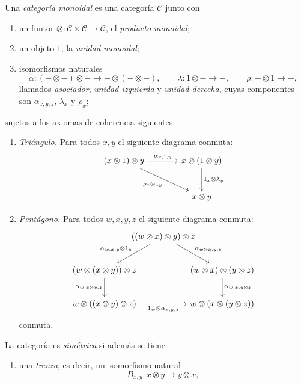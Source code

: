 \begin{defi}\label{defi:monoidal}
Una \emph{categoría monoidal} es una categoría $\mathcal C$ junto con
\begin{enumerate}[label = \textup{(\roman*)}]
\item un funtor $\otimes\colon \mathcal C\times\mathcal C\to\mathcal C$, el \emph{producto monoidal};
\item un objeto $1$, la \emph{unidad monoidal};
\item isomorfismos naturales
\[
\alpha\colon(-\otimes-)\otimes-\longrightarrow-\otimes(-\otimes-),
\qquad
\lambda\colon1\otimes-\longrightarrow-,
\qquad
\rho\colon-\otimes1\longrightarrow-,
\]
llamados \emph{asociador}, \emph{unidad izquierda} y \emph{unidad derecha}, cuyas componentes son $\alpha_{x,y,z}$, $\lambda_x$ y $\rho_x$;
\end{enumerate}
sujetos a los axiomas de coherencia siguientes.
\begin{enumerate}[label = \textup{(\arabic*)}]
\item \emph{Triángulo.} Para todos $x,y$ el siguiente diagrama conmuta:
\[
\begin{tikzcd}[column sep=large, row sep=large]
(x\otimes1)\otimes y \arrow[r,"\alpha_{x,1,y}"] \arrow[dr,"\rho_x\otimes1_y"'] & x\otimes(1\otimes y) \arrow[d,"1_x\otimes\lambda_y"]\\
& x\otimes y
\end{tikzcd}
\]

\item\emph{Pentágono.} Para todos $w,x,y,z$ el siguiente diagrama conmuta:
\[
\begin{tikzcd}[
    column sep={7em,between origins},
    row sep={4em,between origins}
]
& ((w\otimes x)\otimes y)\otimes z
    \arrow[dl, "{\alpha_{w,x,y}\otimes1_z}"']
    \arrow[dr, "{\alpha_{w\otimes x,y,z}}"]
&
\\
(w\otimes(x\otimes y))\otimes z
    \arrow[d, "{\alpha_{w,x\otimes y,z}}"']
&&
(w\otimes x)\otimes(y\otimes z)
    \arrow[d, "{\alpha_{w,x,y\otimes z}}"]
\\
w\otimes((x\otimes y)\otimes z)
    \arrow[rr, "{1_w\otimes\alpha_{x,y,z}}"']
&&
w\otimes(x\otimes(y\otimes z))
\end{tikzcd}
\]
conmuta.
\end{enumerate}

La categoría es \emph{simétrica} si además se tiene
\begin{enumerate}[label = \textup{(\arabic*)}, start=3]
\item una \emph{trenza}, es decir, un isomorfismo natural
\[
B_{x,y}\colon x\otimes y\longrightarrow y\otimes x,
\]


\end{enumerate}
\end{defi}
